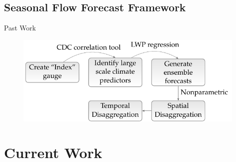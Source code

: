 \documentclass{beamer}
\begin{document}
\subsection{Seasonal Flow Forecast Framework}
\begin{frame}{Past Work}
%

\begin{figure}[htbp]
   \centering
   \includegraphics[width=.9\textwidth]{figs/framework.pdf} 
\end{figure}

\end{frame}

\section{Current Work}
\end{document}
